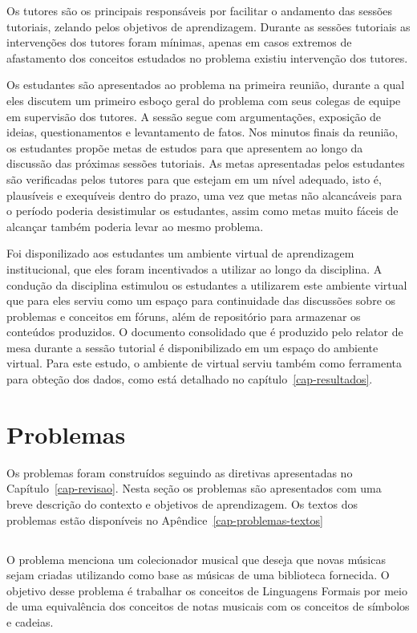 Os tutores são os principais responsáveis por facilitar o andamento
das sessões tutoriais, zelando pelos objetivos de aprendizagem.
Durante as sessões tutoriais as intervenções dos tutores
foram mínimas, apenas em casos extremos de
afastamento dos conceitos estudados no problema existiu intervenção dos tutores.

Os estudantes são apresentados ao problema na primeira reunião, durante
a qual eles discutem um primeiro esboço geral do problema com seus
colegas de equipe em supervisão dos tutores.
A sessão segue com argumentações, exposição de ideias,
questionamentos e levantamento de fatos.
Nos minutos finais da reunião, os estudantes propõe metas de estudos para
que apresentem ao longo da discussão das próximas sessões tutoriais.
As metas apresentadas pelos estudantes são verificadas pelos tutores
para que estejam em um nível adequado, isto é, plausíveis e exequíveis
dentro do prazo, uma vez que metas não
alcancáveis para o período poderia desistimular os estudantes, assim
como metas muito fáceis de alcançar também poderia levar
ao mesmo problema.

Foi disponilizado aos estudantes um ambiente virtual de aprendizagem
institucional, que eles foram incentivados a utilizar ao longo
da disciplina.
A condução da disciplina estimulou os estudantes a
utilizarem este ambiente virtual que para eles serviu como um
espaço para continuidade das discussões sobre os problemas
e conceitos em fóruns, além de repositório para armazenar
os conteúdos produzidos.
O documento consolidado que é produzido pelo relator de mesa
durante a sessão tutorial é disponibilizado em um espaço
do ambiente virtual.
Para este estudo, o ambiente de virtual serviu
também como ferramenta para obteção dos dados,
como está detalhado no
capítulo~\ref{cap-resultados}.

\section{Problemas}
Os problemas foram construídos seguindo as diretivas
apresentadas no Capítulo~\ref{cap-revisao}.
Nesta seção os problemas são apresentados com uma breve
descrição do contexto e objetivos de aprendizagem.
Os textos dos problemas estão disponíveis no
Apêndice~\ref{cap-problemas-textos}

\subsection{\ProblemaA}
O problema menciona um colecionador musical que deseja que
novas músicas sejam criadas utilizando como base as músicas
de uma biblioteca fornecida.
O objetivo desse problema é trabalhar os conceitos de
Linguagens Formais por meio de uma equivalência dos conceitos
de notas musicais com os conceitos de símbolos e cadeias.

